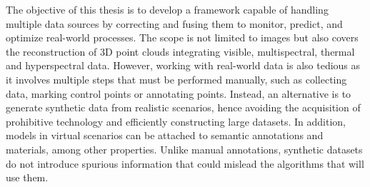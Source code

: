 
\normalsize
\libertineNormal

The objective of this thesis is to develop a framework capable of handling multiple data sources by correcting and fusing them to monitor, predict, and optimize real-world processes. The scope is not limited to images but also covers the reconstruction of 3D point clouds integrating visible, multispectral, thermal and hyperspectral data. However, working with real-world data is also tedious as it involves multiple steps that must be performed manually, such as collecting data, marking control points or annotating points. Instead, an alternative is to generate synthetic data from realistic scenarios, hence avoiding the acquisition of prohibitive technology and efficiently constructing large datasets. In addition, models in virtual scenarios can be attached to semantic annotations and materials, among other properties. Unlike manual annotations, synthetic datasets do not introduce spurious information that could mislead the algorithms that will use them.



